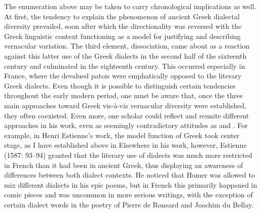 The enumeration above may be taken to carry chronological implications as well. At first, the tendency to explain the phenomenon of ancient Greek dialectal diversity prevailed, soon after which the directionality was reversed with the Greek linguistic context functioning as a model for justifying and describing vernacular variation. The third element, dissociation, came about as a reaction against this latter use of the Greek dialects in the second half of the sixteenth century and culminated in the eighteenth century. This occurred especially in France, where the devalued patois were emphatically opposed to the literary Greek dialects. Even though it is possible to distinguish certain tendencies throughout the early modern period, one must be aware that, once the three main approaches toward Greek vis-à-vis vernacular diversity were established, they often coexisted. Even more, one scholar could reflect and reunite different approaches in his work, even as seemingly contradictory attitudes as  and . For example, in Henri Estienne’s work, the model function of Greek took center stage, as I have established above in  Elsewhere in his work, however, Estienne (1587: 93–94) granted that the literary use of dialects was much more restricted in French than it had been in ancient Greek, thus displaying an awareness of differences between both dialect contexts. He noticed that Homer was allowed to mix different dialects in his epic poems, but in French this primarily happened in comic pieces and was uncommon in more serious writings, with the exception of certain dialect words in the poetry of Pierre de Ronsard and Joachim du Bellay.

